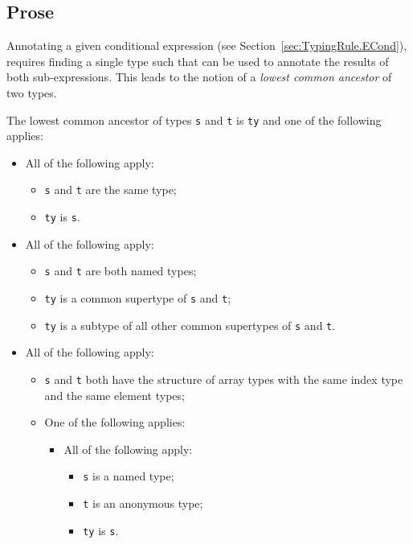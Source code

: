 \documentclass{book}
\begin{document}
\subsection{Prose}
  Annotating a given conditional expression (see Section~\ref{sec:TypingRule.ECond}),
  requires finding a single type such that can be used to annotate the results of both sub-expressions.
  This leads to the notion of a \emph{lowest common ancestor} of two types.

  The lowest common ancestor of types \texttt{s} and \texttt{t} is \texttt{ty} and one of the following applies:
  \begin{itemize}
  \item All of the following apply:
    \begin{itemize}
    \item \texttt{s} and \texttt{t} are the same type;
    \item \texttt{ty} is \texttt{s}.
    \end{itemize}

  \item All of the following apply:
    \begin{itemize}
    \item \texttt{s} and \texttt{t} are both named types;
    \item \texttt{ty} is a common supertype of \texttt{s} and \texttt{t};
    \item \texttt{ty} is a subtype of all other common supertypes of \texttt{s} and \texttt{t}.
    \end{itemize}

  \item All of the following apply:
    \begin{itemize}
    \item \texttt{s} and \texttt{t} both have the structure of array types with the same index type
      and the same element types;

    \item One of the following applies:
      \begin{itemize}
      \item All of the following apply:
        \begin{itemize}
        \item \texttt{s} is a named type;
        \item \texttt{t} is an anonymous type;
        \item \texttt{ty} is \texttt{s}.
        \end{itemize}


\end{itemize}
\end{itemize}
\end{itemize}
\end{document}
